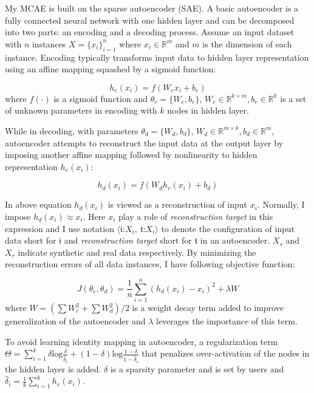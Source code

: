 \documentclass{iitthesis}
\begin{document}
 My MCAE is built on the sparse autoencoder (SAE). A basic autoencoder is a fully connected neural network with one hidden layer and can be decomposed into two parts: an encoding and a decoding process. Assume an input dataset with $n$ instances $X=\{x_{i}\}_{i=1}^{n}$ where $x_{i}\in{\mathbb{R}^{m}}$ and $m$ is the dimension of each instance. Encoding typically transforms input data to hidden layer representation using an affine mapping squashed by a sigmoid function:

\begin{equation}
h_{e}(x_{i})=f(W_{e}x_{i}+b_{e})\label{eq:encoder}
\end{equation}
where $f(\cdot)$ is a sigmoid function and $\theta_{e}=\{W_{e},b_{e}\}$,
$W_{e}\in\mathbb{R}^{k\times m},b_{e}\in\mathbb{R}^{k}$ is a set
of unknown parameters in encoding with $k$ nodes in hidden layer.

While in decoding, with parameters $\theta_{d}=\{W_{d},b_{d}\}$, $W_{d}\in\mathbb{R}^{m\times k},b_{d}\in\mathbb{R}^{m}$, autoencoder attempts to reconstruct the input data at the output layer by imposing
another affine mapping followed by nonlinearity to hidden representation $h_{e}(x_{i})$:

\begin{equation}
h_{d}(x_{i})=f(W_{d}h_{e}(x_{i})+b_{d})\label{eq:decoding}
\end{equation}


In above equation $h_{d}(x_{i})$ is viewed as a reconstruction of input $x_{i}$. Normally, I impose $h_{d}(x_{i})\approx x_{i}$. Here $x_{i}$ play a role of \textit{reconstruction target} in this
expression and I use notation $\langle\mathfrak{i}\text{:}X_{i},\:\mathfrak{t}\text{:}X_{i}\rangle$ to denote the configuration of input data short for $\mathfrak{i}$ and \textit{reconstruction target} short for $\mathfrak{t}$ in an autoencoder. $X_{s}$ and $X_{r}$ indicate synthetic and real data respectively. By minimizing the reconstruction errors of all data instances, I have following objective function:

\begin{equation}
J(\theta_{e},\theta_{d})=\frac{1}{n}\sum_{i=1}^{n}(h_{d}(x_{i})-x_{i})^{2}+\lambda W\label{eq:reconstruction_error_basic}
\end{equation}
where $W=({\sum W_{e}^{2}+\sum W_{d}^{2}})/2$ is a weight decay term
added to improve generalization of the autoencoder and $\lambda$
leverages the importance of this term.

To avoid learning identity mapping in autoencoder, a regularization
term $\Theta=\sum_{i=1}^{k}{\delta\text{log}\frac{\delta}{\hat{\delta}_{i}}+(1-\delta)\text{log}\frac{1-\delta}{1-\hat{\delta}_{i}}}$ that penalizes over-activation of the nodes in the hidden layer is
added. $\delta$ is a sparsity parameter and is set by users and $\hat{\delta}_{i}=\frac{1}{k}\sum_{i=1}^{k}h_{e}(x_{i})$.
\end{document}
